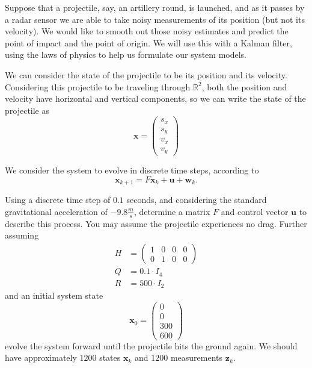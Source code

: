
Suppose that a projectile, say, an artillery round, is launched, and as it passes by a radar sensor we are able to take noisy measurements of its position (but not its velocity). We would like to smooth out those noisy estimates and predict the point of impact and the point of origin. We will use this with a Kalman filter, using the laws of physics to help us formulate our system models.

We can consider the state of the projectile to be its position and its velocity. Considering this projectile to be traveling through $\mathbb{R}^{2}$, both the position and velocity have horizontal and vertical components, so we can write the state of the projectile as 
\begin{equation*}
\mathbf{x} = \left( \begin{array}{c} s_{x} \\ s_{y} \\ v_{x} \\ v_{y} \end{array} \right)
\end{equation*}

We consider the system to evolve in discrete time steps, according to $$\mathbf{x}_{k+1} = F\mathbf{x}_{k} + \mathbf{u} + \mathbf{w}_{k}.$$

\begin{problem}
Using a discrete time step of $0.1$ seconds, and considering the standard gravitational acceleration of $-9.8 \frac{m}{s}$, determine a matrix $F$ and control vector $\mathbf{u}$ to describe this process. You may assume the projectile experiences no drag. Further assuming 
\begin{align*}
H & = \left( \begin{array}{cccc} 1 & 0 & 0 & 0 \\ 0 & 1 & 0 & 0 \end{array} \right) \\
Q & = 0.1 \cdot I_{4} \\
R & = 500 \cdot I_{2}
\end{align*}
and an initial system state 
\begin{equation*}
\mathbf{x}_{0} = \left( \begin{array}{c} 0 \\ 0 \\ 300 \\ 600 \end{array} \right)
\end{equation*}
evolve the system forward until the projectile hits the ground again. We should have approximately $1200$ states $\mathbf{x}_{k}$ and $1200$ measurements $\mathbf{z}_{k}$.
\end{problem}

